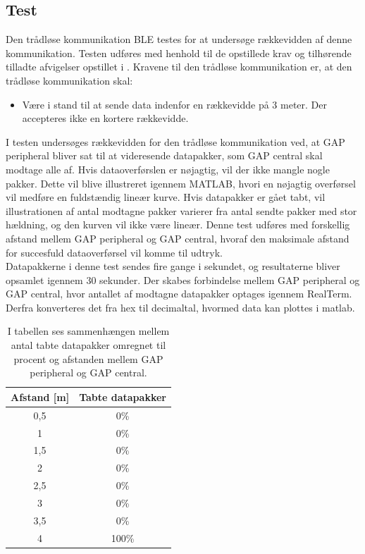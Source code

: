 \subsection{Test}
Den trådløse kommunikation BLE testes for at undersøge rækkevidden af denne kommunikation. Testen udføres med henhold til de opstillede krav og tilhørende tilladte afvigelser opstillet i . Kravene til den trådløse kommunikation er, at den trådløse kommunikation skal:
\begin{itemize}
	\item Være i stand til at sende data indenfor en rækkevidde på 3 meter. Der accepteres ikke en kortere rækkevidde.
\end{itemize}

I testen undersøges rækkevidden for den trådløse kommunikation ved, at GAP peripheral bliver sat til at videresende datapakker, som GAP central skal modtage alle af. Hvis dataoverførslen er nøjagtig, vil der ikke mangle nogle pakker. Dette vil blive illustreret igennem MATLAB, hvori en nøjagtig overførsel vil medføre en fuldstændig lineær kurve. Hvis datapakker er gået tabt, vil illustrationen af antal modtagne pakker varierer fra antal sendte pakker med stor hældning, og den kurven vil ikke være lineær. Denne test udføres med forskellig afstand mellem GAP peripheral og GAP central, hvoraf den maksimale afstand for succesfuld dataoverførsel vil komme til udtryk. \\
Datapakkerne i denne test sendes fire gange i sekundet, og resultaterne bliver opsamlet igennem 30 sekunder. Der skabes forbindelse mellem GAP peripheral og GAP central, hvor antallet af modtagne datapakker optages igennem RealTerm. Derfra konverteres det fra hex til decimaltal, hvormed data kan plottes i matlab.
\begin{table}[H]
	\centering
	\begin{tabular}{cc}
			\hline
		\rowcolor[HTML]{C0C0C0} 
		Afstand {[}m{]} & Tabte datapakker \\ 	\hline
		0,5 	& 0\% \\ 	\hline
		1 		& 0\% \\	\hline
		1,5 	& 0\% \\	\hline
		2 		& 0\% \\	\hline
		2,5 	& 0\% \\	\hline
		3 		& 0\% \\	\hline
		3,5 	& 0\% \\	\hline
		4 		& 100\% \\	\hline
	\end{tabular}
	\caption{I tabellen ses sammenhængen mellem antal tabte datapakker omregnet til procent og afstanden mellem GAP peripheral og GAP central.}
	\label{test:ble_overforsel}
\end{table} \vspace{-.5cm}
